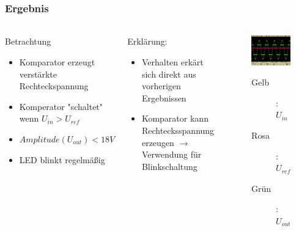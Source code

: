 \begin{frame}
\frametitle{Ergebnis}
\framesubtitle{}
    \begin{columns}[c]
    \begin{block}{Betrachtung}
        \begin{itemize}
            \item Komparator erzeugt verstärkte Rechteckspannung 
            \item Komperator "schaltet" wenn $U_{in} > U_{ref}$
            \item $Amplitude(U_{out}) < 18V$
            \item LED blinkt regelmäßig
        \end{itemize}
    \end{block}
    \begin{block}{Erklärung:}
        \begin{itemize}
            \item Verhalten erkärt sich direkt aus vorherigen Ergebnissen
            \item Komparator kann Rechtecksspannung erzeugen $\rightarrow$
            Verwendung für Blinkschaltung
        \end{itemize}
    \end{block}
    \begin{figure}[H]
    \begin{center}
            \includegraphics[scale=0.15]{./img/oszi/scope_1.png}
    \end{center}
    \begin{description}
        \item[Gelb]: $U_{in}$
        \item[Rosa]: $U_{ref}$
        \item[Grün]: $U_{out}$
    \end{description}
    \end{figure}
    \end{columns}
\end{frame}
